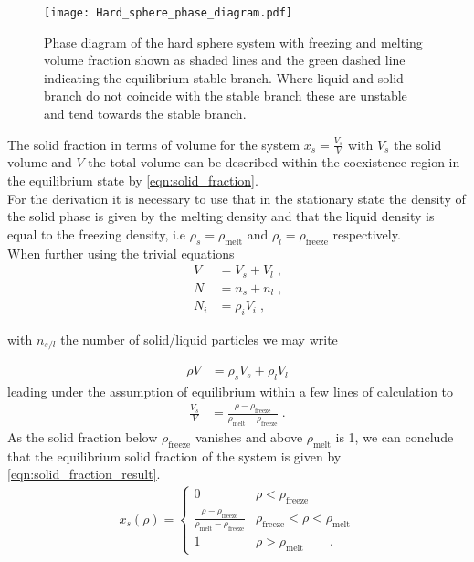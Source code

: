 \begin{figure}[h]
\centering
\texttt{[image: Hard\_sphere\_phase\_diagram.pdf]}
\caption[Hard sphere phase diagram]{Phase diagram of the hard sphere system with freezing and melting volume fraction shown as shaded lines and the green dashed line indicating the equilibrium stable branch. Where liquid and solid branch do not coincide with the stable branch these are unstable and tend towards the stable branch.}
\label{fig:hs_phase_diagram}
\end{figure}

The solid fraction in terms of volume for the system $x_s = \frac{V_s}{V}$ with $V_s$ the solid volume and $V$ the total volume can be described within the coexistence region in the equilibrium state by \autoref{eqn:solid_fraction}.\\ 
For the derivation it is necessary to use that in the stationary state the density of the solid phase is given by the melting density and that the liquid density is equal to the freezing density, i.e $\rho_s = \rho_{\text{melt}}$ and $\rho_l = \rho_{\text{freeze}}$ respectively.\\
When further using the trivial equations
\begin{align}
V &= V_s + V_l \; \text{,} \nonumber\\
N &= n_s + n_l \; \text{,} \nonumber\\
N_i &= \rho_i V_i \; \text{,} 
\end{align}

with $n_{s/l}$ the number of solid/liquid particles we may write

\begin{align}
\rho V &= \rho_s V_s + \rho_l V_l
\end{align}
leading under the assumption of equilibrium within a few lines of calculation to 
\begin{align}
\frac{V_s}{V} &= \frac{\rho - \rho_{\text{freeze}}}{\rho_{\text{melt}} - \rho_{\text{freeze}} } \; \text{.}
\end{align}
As the solid fraction below $\rho_{\text{freeze}} $ vanishes and above $\rho_{\text{melt}}$ is 1, we can conclude that the equilibrium solid fraction of the system is given by \autoref{eqn:solid_fraction_result}.
\begin{align}
\label{eqn:solid_fraction_result}
x_s(\rho) = 
\begin{cases}
0 & \rho <  \rho_{\text{freeze}}\\
\frac{\rho-\rho_{\text{freeze}}}{\rho_{\text{melt}}-\rho_{\text{freeze}}} &  \rho_{\text{freeze}} < \rho <  \rho_{\text{melt}}\\ 
1 &  \rho > \rho_{\text{melt}} \quad \quad \text{.}
\end{cases}
\end{align}

